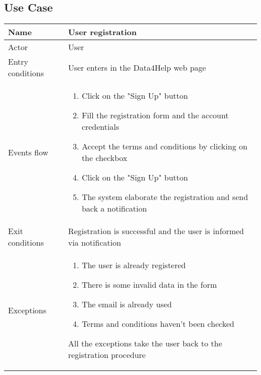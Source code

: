 \subsection{Use Case}
\begin{table}[h!]
\begin{tabular}{|l|p{12cm}|}
\hline
Name             & User registration \\ \hline
Actor            & User \\ \hline
Entry conditions & User enters in the Data4Help web page \\ \hline
Events flow      & \begin{enumerate}
\item Click on the "Sign Up" button
\item Fill the registration form and the account credentials
\item Accept the terms and conditions by clicking on the checkbox 
\item Click on the "Sign Up" button
\item The system elaborate the registration and send back a notification
\end{enumerate} 
\\ \hline
Exit conditions  & Registration is successful and the user is informed via notification \\ \hline
Exceptions       & \begin{enumerate}
\item The user is already registered
\item There is some invalid data in the form
\item The email is already used
\item Terms and conditions haven't been checked
\end{enumerate} All the exceptions take the user back to the registration procedure \\ \hline
\end{tabular}
\end{table}

